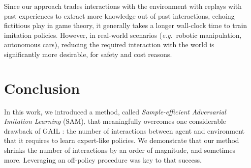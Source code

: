 Since our approach trades interactions with
the environment with replays with past experiences
to extract more knowledge out of past interactions,
echoing fictitious play in game theory,
it generally takes a longer wall-clock time to train imitation policies.
However, in real-world scenarios (\textit{e.g.}~robotic
manipulation, autonomous cars), reducing the required interaction with the
world is significantly more desirable, for safety and cost reasons.

\section{Conclusion}

In this work, we introduced a method, called
\textit{Sample-efficient Adversarial Imitation Learning} (SAM),
that meaningfully overcomes one
considerable drawback of
GAIL \cite{Ho2016-bv}:
the number of interactions between agent and environment that it requires to learn
expert-like policies.
We demonstrate that our method shrinks the number of interactions by an order
of magnitude, and sometimes more.
Leveraging an off-policy procedure was key to that success.
